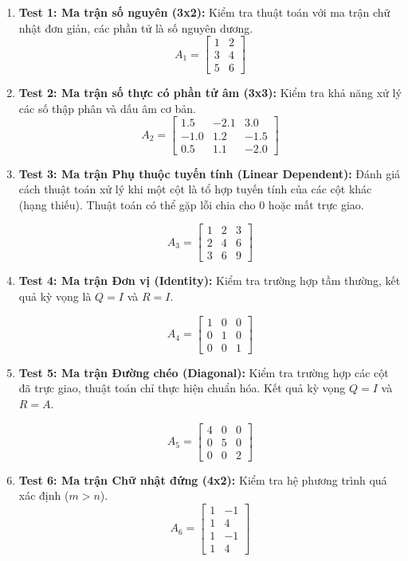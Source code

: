 \begin{enumerate}
    \item \textbf{Test 1: Ma trận số nguyên (3x2):} Kiểm tra thuật toán với ma trận chữ nhật đơn giản, các phần tử là số nguyên dương.
    $$ A_1 = \begin{bmatrix} 1 & 2 \\ 3 & 4 \\ 5 & 6 \end{bmatrix} $$

    \item \textbf{Test 2: Ma trận số thực có phần tử âm (3x3):} Kiểm tra khả năng xử lý các số thập phân và dấu âm cơ bản.
    $$ A_2 = \begin{bmatrix} 1.5 & -2.1 & 3.0 \\ -1.0 & 1.2 & -1.5 \\ 0.5 & 1.1 & -2.0 \end{bmatrix} $$

    \item \textbf{Test 3: Ma trận Phụ thuộc tuyến tính (Linear Dependent):} Đánh giá cách thuật toán xử lý khi một cột là tổ hợp tuyến tính của các cột khác (hạng thiếu). Thuật toán có thể gặp lỗi chia cho 0 hoặc mất trực giao.

    $$ A_3 = \begin{bmatrix} 1 & 2 & 3 \\ 2 & 4 & 6 \\ 3 & 6 & 9 \end{bmatrix} $$

    \item \textbf{Test 4: Ma trận Đơn vị (Identity):}  Kiểm tra trường hợp tầm thường, kết quả kỳ vọng là $Q = I$ và $R = I$.

    $$ A_4 = \begin{bmatrix} 1 & 0 & 0 \\ 0 & 1 & 0 \\ 0 & 0 & 1 \end{bmatrix} $$

    \item \textbf{Test 5: Ma trận Đường chéo (Diagonal):}  Kiểm tra trường hợp các cột đã trực giao, thuật toán chỉ thực hiện chuẩn hóa. Kết quả kỳ vọng $Q = I$ và $R = A$.

    $$ A_5 = \begin{bmatrix} 4 & 0 & 0 \\ 0 & 5 & 0 \\ 0 & 0 & 2 \end{bmatrix} $$

    \item \textbf{Test 6: Ma trận Chữ nhật đứng (4x2):} Kiểm tra hệ phương trình quá xác định ($m > n$).
    $$ A_6 = \begin{bmatrix} 1 & -1 \\ 1 & 4 \\ 1 & -1 \\ 1 & 4 \end{bmatrix} $$


\end{enumerate}

